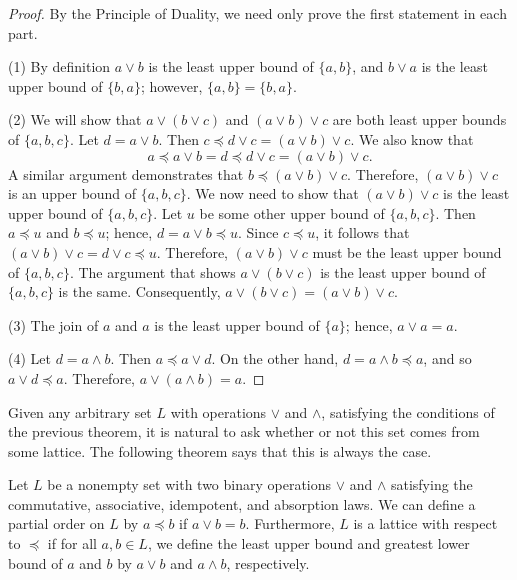  
\begin{proof}
By the Principle
of Duality, we need only prove the first statement in each part. 
 
 
(1)  
By definition $a \vee b$ is the least upper bound of $\{ a, b\}$, and
$b \vee a$ is the least upper bound of $\{ b, a \}$; however, $\{ a, b\} 
= \{ b, a \}$.
 
 
(2)
We will show that $a \vee ( b \vee c)$ and $(a \vee b) \vee c$
are both least upper bounds of $\{ a, b, c \}$.	 Let $d =  a \vee b$.
Then $c \preceq  d \vee c = (a \vee b) \vee c$. We also know that 
\[
a \preceq  a \vee b =d \preceq  d \vee c = (a \vee b) \vee c.
\]
A similar argument demonstrates that $b \preceq (a \vee b) \vee c$.
Therefore, $(a \vee b) \vee c$ is an upper bound of $\{ a, b, c \}$.
We now need to show that $(a \vee b) \vee c$ is the least upper bound
of $\{ a, b, c\}$. Let $u$ be some other upper bound of $\{ a, b, c \}$. 
Then $a \preceq u$ and $b \preceq u$; hence, $d = a \vee b \preceq u$.
Since $c \preceq u$, it follows that $(a \vee b) \vee c = d \vee c
\preceq u$. Therefore, $(a \vee b) \vee c$ must be the least upper 
bound of $\{ a, b, c\}$. The argument that shows  $a \vee ( b \vee c)$ 
is the least upper bound of $\{ a, b, c \}$ is the same.  Consequently,
$a \vee ( b \vee c) = (a \vee b) \vee c$.
 
 
(3)
The join of $a$ and $a$ is the least upper bound of $\{ a \}$; hence,
$a \vee a = a$.
 
 
(4)
Let $d = a \wedge b$. Then $a \preceq a \vee d$.  On the other hand,
$d = a \wedge b \preceq a$, and so $a \vee d \preceq a$.  Therefore,
$a \vee ( a \wedge b) = a$.
\end{proof}
 
 
\medskip
 
 
Given any arbitrary set $L$ with operations $\vee$ and $\wedge$, 
satisfying the conditions of the previous theorem, it is natural
to ask whether or not this set comes from some lattice.  The
following theorem says that this is always the case.
 
 
\begin{theorem}\label{boolean:PO_theorem}
Let $L$ be a nonempty set with two binary operations $\vee$ and
$\wedge$ satisfying the commutative, associative, idempotent, and  
absorption laws.  We can define a partial order on $L$ by  $a \preceq
b$ if $a \vee b = b$. Furthermore, $L$ is a lattice with respect 
to $\preceq$ if for all $a, b \in L$, we define the least upper bound
and greatest lower bound of $a$ and $b$ by $a \vee b$ and $a \wedge
b$, respectively.
\end{theorem}
 
